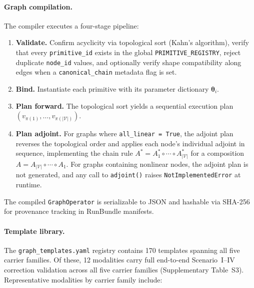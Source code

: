 \paragraph{Graph compilation.}
The compiler executes a four-stage pipeline:
\begin{enumerate}
  \item \textbf{Validate.}  Confirm acyclicity via topological sort
    (Kahn's algorithm), verify that every \texttt{primitive\_id}
    exists in the global \texttt{PRIMITIVE\_REGISTRY}, reject
    duplicate \texttt{node\_id} values, and optionally verify shape
    compatibility along edges when a \texttt{canonical\_chain}
    metadata flag is set.
  \item \textbf{Bind.}  Instantiate each primitive with its parameter
    dictionary $\boldsymbol{\theta}_i$.
  \item \textbf{Plan forward.}  The topological sort yields a sequential
    execution plan $(v_{\pi(1)}, \ldots, v_{\pi(|\mathcal{V}|)})$.
  \item \textbf{Plan adjoint.}  For graphs where
    \texttt{all\_linear = True}, the adjoint plan reverses the
    topological order and applies each node's individual adjoint in
    sequence, implementing the chain rule $A^* = A_1^*
    \circ \cdots \circ A_{|\mathcal{V}|}^*$ for a composition $A = A_{|\mathcal{V}|}
    \circ \cdots \circ A_1$.  For graphs containing nonlinear nodes,
    the adjoint plan is not generated, and any call to
    \texttt{adjoint()} raises \texttt{NotImplementedError} at runtime.
\end{enumerate}
The compiled \texttt{GraphOperator} is serializable to JSON and hashable
via SHA-256 for provenance tracking in RunBundle manifests.

\paragraph{Template library.}
The \texttt{graph\_templates.yaml} registry contains 170 templates
spanning all five carrier families. Of these, 12 modalities carry full
end-to-end Scenario~I--IV correction validation across all five carrier
families (Supplementary Table~S3). Representative modalities by carrier family include:

